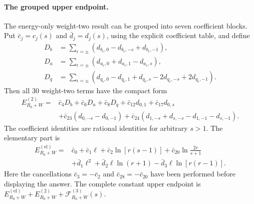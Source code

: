 \paragraph{The grouped upper endpoint.} The energy-only weight-two result can be grouped into seven coefficient
blocks. Put $\bar c_j=c_j(s)$ and $\bar d_j=d_j(s)$, using the explicit
coefficient table, and define
\begin{align}
 D_b&=\sum_{\epsilon=\pm}
       (d_{b_\epsilon,0}-d_{b_\epsilon,-s}+d_{b_\epsilon,-1}),\\
 D_a&=\sum_{\epsilon=\pm}
       (d_{a_\epsilon,0}+d_{a_\epsilon,1}-d_{a_\epsilon,s}),\\
 D_q&=\sum_{\epsilon=\pm}
       (d_{q_\epsilon,0}-d_{q_\epsilon,1}+d_{q_\epsilon,s}
                      -2d_{q_\epsilon,-s}+2d_{q_\epsilon,-1}).
\end{align}
Then all 30 weight-two terms have the compact form
\begin{align}
 E^{(2)}_{R_0+W}={}&\bar c_4D_b+\bar c_6D_a+\bar c_8D_q
       +\bar c_{12}d_{0,1}+\bar c_{17}d_{0,s}\\
 &+\bar c_{23}(d_{0,-s}-d_{0,-1})
       +\bar c_{24}(d_{1,-s}+d_{s,-s}-d_{1,-1}-d_{s,-1}).
\end{align}
The coefficient identities are rational identities for arbitrary $s>1$.
The elementary part is
\begin{align}
 E^{(\mathrm{el})}_{R_0+W}={}&\bar c_0+\bar c_1\ell
 +\bar c_2\ln[r(s-1)]+\bar c_{20}\ln\frac{2r}{s+1}\\
 &+\bar d_1\ell^2+\bar d_2\ell\ln(r+1)
                         -\bar d_3\ell\ln[r(r-1)].
\end{align}
Here the cancellations $\bar c_3=-\bar c_2$ and
$\bar c_{28}=-\bar c_{20}$ have been performed before displaying the
answer. The complete constant upper endpoint is
$E^{(\mathrm{el})}_{R_0+W}+E^{(2)}_{R_0+W}
+\mathcal F^{(3)}_{R_0+W}(s)$.
